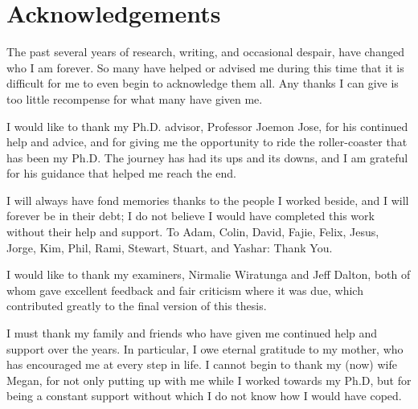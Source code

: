 
\chapter*{Acknowledgements}
The past several years of research, writing, and occasional despair, have changed who I am forever.
So many have helped or advised me during this time that it is difficult for me to even begin to acknowledge them all.
Any thanks I can give is too little  recompense for what many have given me.

I would like to thank my Ph.D. advisor, Professor Joemon Jose, for his continued help and advice, and for giving me the opportunity to ride the roller-coaster that has been my Ph.D.
The journey has had its ups and its downs, and I am grateful for his guidance that  helped me reach the end.

I will always have fond memories thanks to the people I worked beside, and I will forever be in their debt;
I do not believe I would have completed this work without their help and support.
To Adam, Colin, David, Fajie, Felix, Jesus, Jorge, Kim, Phil, Rami, Stewart, Stuart, and Yashar: Thank You.

I would like to thank my examiners, Nirmalie Wiratunga and Jeff Dalton, both of whom gave excellent feedback and fair criticism where it was due, which contributed greatly to the final version of this thesis.

I must thank my family and friends who have given me continued help and support over the years.
In particular, I owe eternal gratitude to my mother, who has encouraged me at every step in life.
I cannot begin to thank my (now) wife Megan, for not only putting up with me while I worked towards my Ph.D, but for being a constant support without which I do not know how I would have coped.

